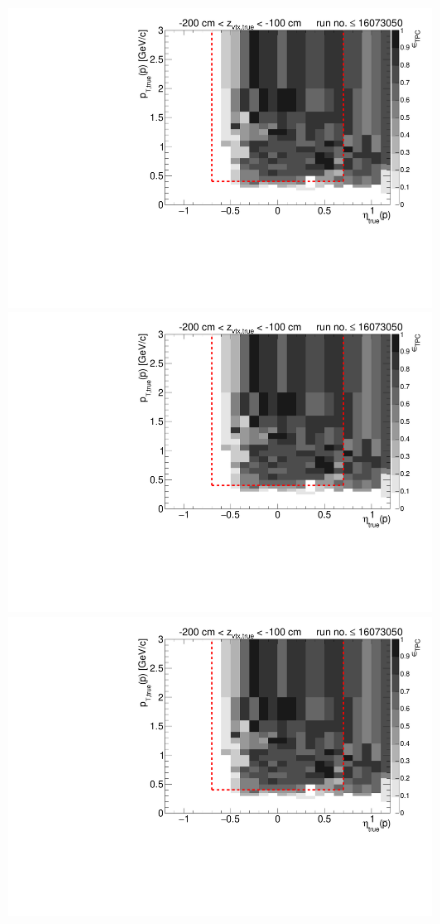 \begin{figure}[hb]\ContinuedFloat
\centering
\parbox{0.495\textwidth}{
  \centering
  \includegraphics[width=\linewidth,page=11]{graphics/eff/Eff2D_TPC_proton_Minus_RunRange1.pdf}\\
  \includegraphics[width=\linewidth,page=13]{graphics/eff/Eff2D_TPC_proton_Minus_RunRange1.pdf}\\
  \includegraphics[width=\linewidth,page=15]{graphics/eff/Eff2D_TPC_proton_Minus_RunRange1.pdf}\\
}
\end{figure}
